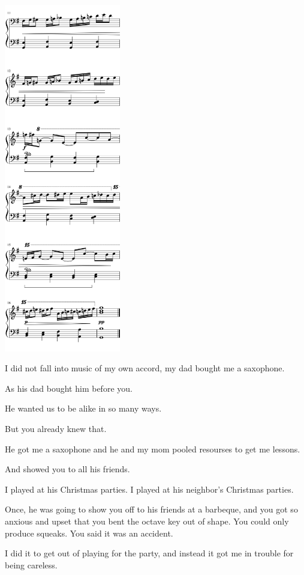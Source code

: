 \begin{paracol}{2}
\begin{rightcolumn*}
\noindent\includegraphics[width=2in]{assets/static/miniatures/1-2.png}
\end{rightcolumn*}
\begin{leftcolumn}
  \noindent I did not fall into music of my own accord, my dad bought me a saxophone.

\begin{ally}
As his dad bought him before you.
\end{ally}
He wanted us to be alike in so many ways.

\begin{ally}
But you already knew that.
\end{ally}
He got me a saxophone and he and my mom pooled resourses to get me lessons.

\begin{ally}
And showed you to all his friends.
\end{ally}
I played at his Christmas parties. I played at his neighbor's Christmas parties.

\begin{ally}
Once, he was going to show you off to his friends at a barbeque, and you got so anxious and upset that you bent the octave key out of shape. You could only produce squeaks. You said it was an accident.
\end{ally}
I did it to get out of playing for the party, and instead it got me in trouble for being careless.


\end{leftcolumn}
\end{paracol}
